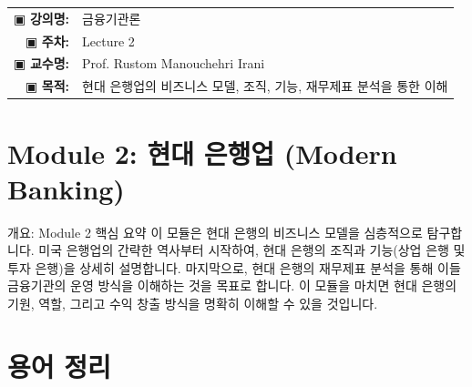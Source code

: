 \documentclass[11pt,a4paper]{article}
\makeatletter
\theoremstyle{definition}
\newcommand{\metainfo}[4]{
\begin{tcolorbox}[
    colback=lightpurple,
    colframe=darkpurple,
    boxrule=1pt,
    arc=2mm,
    left=10pt,
    right=10pt,
    top=8pt,
    bottom=8pt
]
\begin{tabular}{@{}rl@{}}
▣ \textbf{강의명:} & #1 \\[0.3em]
▣ \textbf{주차:} & #2 \\[0.3em]
▣ \textbf{교수명:} & #3 \\[0.3em]
▣ \textbf{목적:} & \begin{minipage}[t]{0.75\textwidth}#4\end{minipage}
\end{tabular}
\end{tcolorbox}
}
\makeatother
\begin{document}
\thispagestyle{firstpage}

\metainfo{금융기관론}{Lecture 2}{Prof. Rustom Manouchehri Irani}{현대 은행업의 비즈니스 모델, 조직, 기능, 재무제표 분석을 통한 이해}

\tableofcontents

\newpage

\section{Module 2: 현대 은행업 (Modern Banking)}

\begin{summarybox}{개요: Module 2 핵심 요약}
이 모듈은 현대 은행의 비즈니스 모델을 심층적으로 탐구합니다. 미국 은행업의 간략한 역사부터 시작하여, 현대 은행의 조직과 기능(상업 은행 및 투자 은행)을 상세히 설명합니다. 마지막으로, 현대 은행의 재무제표 분석을 통해 이들 금융기관의 운영 방식을 이해하는 것을 목표로 합니다. 이 모듈을 마치면 현대 은행의 기원, 역할, 그리고 수익 창출 방식을 명확히 이해할 수 있을 것입니다.
\end{summarybox}

\newpage
\section{용어 정리}
\end{document}
